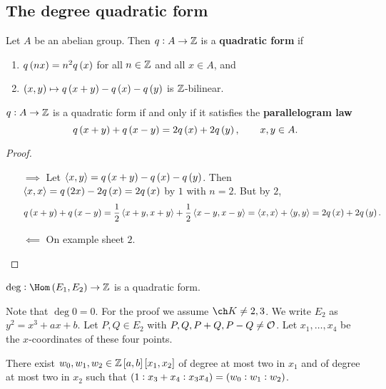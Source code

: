 \subsection{The degree quadratic form}


\begin{definition*}
Let $ A $ be an abelian group. Then $ q : A \to \mathbb{Z} $ is a \textbf{quadratic form} if
\begin{enumerate}
\item $ q\br{nx} = n^2q\br{x} $ for all $ n \in \mathbb{Z} $ and all $ x \in A $, and
\item $ \br{x, y} \mapsto q\br{x + y} - q\br{x} - q\br{y} $ is $ \mathbb{Z} $-bilinear.
\end{enumerate}
\end{definition*}

\begin{lemma}
$ q : A \to \mathbb{Z} $ is a quadratic form if and only if it satisfies the \textbf{parallelogram law}
$$ q\br{x + y} + q\br{x - y} = 2q\br{x} + 2q\br{y}, \qquad x, y \in A. $$
\end{lemma}

\begin{proof}
\hfill
\begin{itemize}
\item[$ \implies $] Let $ \abr{x, y} = q\br{x + y} - q\br{x} - q\br{y} $. Then $ \abr{x, x} = q\br{2x} - 2q\br{x} = 2q\br{x} $ by $ 1 $ with $ n = 2 $. But by $ 2 $,
$$ q\br{x + y} + q\br{x - y} = \dfrac{1}{2}\abr{x + y, x + y} + \dfrac{1}{2}\abr{x - y, x - y} = \abr{x, x} + \abr{y, y} = 2q\br{x} + 2q\br{y}. $$
\item[$ \impliedby $] On example sheet $ 2 $.
\end{itemize}
\end{proof}

\pagebreak

\begin{theorem}
\label{thm:5.6}
$ \deg : \Hom\br{E_1, E_2} \to \ZZ $ is a quadratic form.
\end{theorem}

Note that $ \deg 0 = 0 $. For the proof we assume $ \ch K \ne 2, 3 $. We write $ E_2 $ as $ y^2 = x^3 + ax + b $. Let $ P, Q \in E_2 $ with $ P, Q, P + Q, P - Q \ne \mathcal{O} $. Let $ x_1, \dots, x_4 $ be the $ x $-coordinates of these four points.

\begin{lemma}
\label{lem:5.7}
There exist $ w_0, w_1, w_2 \in \ZZ\sbr{a, b}\sbr{x_1, x_2} $ of degree at most two in $ x_1 $ and of degree at most two in $ x_2 $ such that $ \br{1 : x_3 + x_4 : x_3x_4} = \br{w_0 : w_1 : w_2} $.
\end{lemma}

